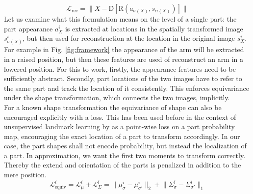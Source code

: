 \begin{equation}
\mathcal{L}_{\textrm{rec}}= \lVert  X  - \mathrm{D}[\mathrm{R}(a_{\sigma(X)}, s_{\alpha(X)})]\rVert
\end{equation}
\label{eq:loss_rec}
Let us examine what this formulation means on the level of a single part: the part appearance $a^i_X$ is extracted at locations in the spatially transformed image $s^i_{\sigma(X)}$, but then used for reconstruction at the location in the original image $s^i_{X}$. For example in Fig.  \ref{fig:framework} the appearance of the arm will be extracted in a raised position, but then these features are used of reconstruct an arm in a lowered position. For this to work, firstly, the appearance features need to be sufficiently abstract. Secondly, part locations of the two images have to refer to the same part and track the location of it consistently. This enforces equivariance under the shape transformation, which connects the two images, implicitly.\\
For a known shape transformation the equivariance of shape can also be encouraged explicitly with a loss. This has been used before in the context of unsupervised landmark learning by \cite{thewlis17, Zhang18} as a point-wise loss on a part probability map, encouraging the exact location of a part to transform accordingly. In our case, the part shapes shall not encode probability, but instead the localization of a part. In approximation, we want the first two moments to transform correctly. Thereby the extend and orientation of the parts is penalized in addition to the mere position.
\begin{equation}
\mathcal{L}_{\textrm{equiv}}^i = \mathcal{L}_{\mu}^i+ \mathcal{L}_{\Sigma}^i = \lVert \mu_{\sigma}^i - \mu_{\sigma'}^i \rVert_{2}    + \lVert \Sigma_{\sigma}^i - \Sigma_{\sigma'}^i  \rVert_{1}
\label{covariance}
\end{equation}
